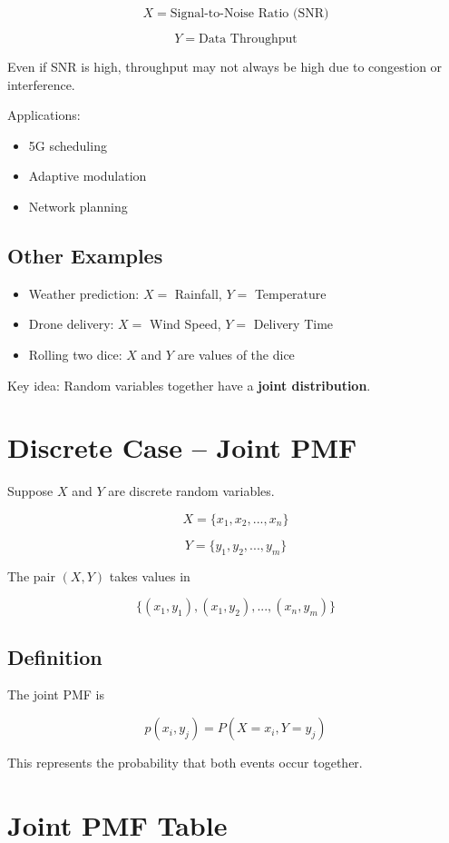 \documentclass{article}
\begin{document}
\[
X = \text{Signal-to-Noise Ratio (SNR)}
\]

\[
Y = \text{Data Throughput}
\]

Even if SNR is high, throughput may not always be high due to congestion or interference.

Applications:

\begin{itemize}
\item 5G scheduling
\item Adaptive modulation
\item Network planning
\end{itemize}

\subsection{Other Examples}

\begin{itemize}
\item Weather prediction: $X=$ Rainfall, $Y=$ Temperature
\item Drone delivery: $X=$ Wind Speed, $Y=$ Delivery Time
\item Rolling two dice: $X$ and $Y$ are values of the dice
\end{itemize}

Key idea: Random variables together have a \textbf{joint distribution}.

\section{Discrete Case -- Joint PMF}

Suppose $X$ and $Y$ are discrete random variables.

\[
X = \{x_1, x_2, ..., x_n\}
\]

\[
Y = \{y_1, y_2, ..., y_m\}
\]

The pair $(X,Y)$ takes values in

\[
\{(x_1,y_1),(x_1,y_2),...,(x_n,y_m)\}
\]

\subsection{Definition}

The joint PMF is

\[
p(x_i,y_j) = P(X = x_i, Y = y_j)
\]

This represents the probability that both events occur together.

\section{Joint PMF Table}
\end{document}

